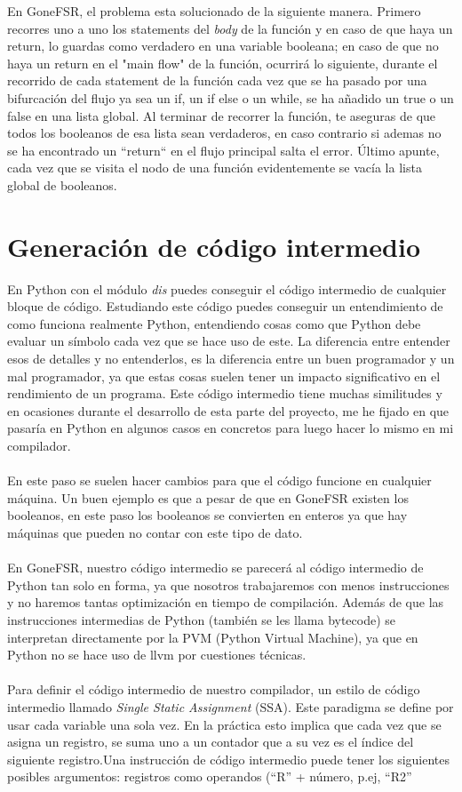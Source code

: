 En GoneFSR, el problema esta solucionado de la siguiente manera. Primero recorres uno a uno los statements del \textit{body} de la función y en caso de que haya un return, lo guardas como verdadero en una variable booleana; en caso de que no haya un return en el "main flow" de la función, ocurrirá lo siguiente, durante el recorrido de cada statement de la función cada vez que se ha pasado por una bifurcación del flujo ya sea un if, un if else o un while, se ha añadido un true o un false en una lista global. Al terminar de recorrer la función, te aseguras de que todos los booleanos de esa lista sean verdaderos, en caso contrario si ademas no se ha encontrado un ``return`` en el flujo principal salta el error. Último apunte, cada vez que se visita el nodo de una función evidentemente se vacía la lista global de booleanos.
\section{Generación de código intermedio}
En Python con el módulo \textit{dis} puedes conseguir el código intermedio de cualquier bloque de código. Estudiando este código puedes conseguir un entendimiento de como funciona realmente Python, entendiendo cosas como que Python debe evaluar un símbolo cada vez que se hace uso de este. La diferencia entre entender esos de detalles y no entenderlos, es la diferencia entre un buen programador y un mal programador, ya que estas cosas suelen tener un impacto significativo en el rendimiento de un programa. Este código intermedio tiene muchas similitudes y en ocasiones durante el desarrollo de esta parte del proyecto, me he fijado en que pasaría en Python en algunos casos en concretos para luego hacer lo mismo en mi compilador. \\\\
\noindent En este paso se suelen hacer cambios para que el código funcione en cualquier máquina. Un buen ejemplo es que a pesar de que en GoneFSR existen los booleanos, en este paso los booleanos se convierten en enteros ya que hay máquinas que pueden no contar con este tipo de dato. \\\\
En GoneFSR, nuestro código intermedio se parecerá al código intermedio de Python tan solo en forma, ya que nosotros trabajaremos con menos instrucciones y no haremos tantas optimización en tiempo de compilación. Además de que las instrucciones intermedias de Python (también se les llama bytecode) se interpretan directamente por la PVM (Python Virtual Machine), ya que en Python no se hace uso de llvm por cuestiones técnicas. \\\\
Para definir el código intermedio de nuestro compilador, un estilo de código intermedio llamado \textit{Single Static Assignment} (SSA). Este paradigma se define por usar cada variable una sola vez. En la práctica esto implica que cada vez que se asigna un registro, se suma uno a un contador que a su vez es el índice del siguiente registro.Una instrucción de código intermedio puede tener los siguientes posibles argumentos: registros como operandos (``R'' + número, p.ej, ``R2''

